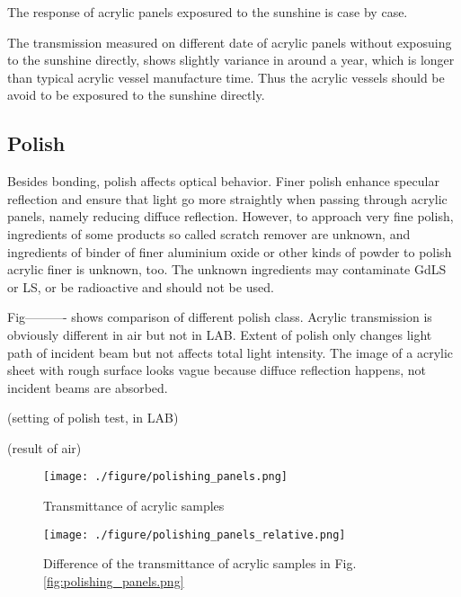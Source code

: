 

The response of acrylic panels exposured to the sunshine is case by case.


The transmission measured on different date of acrylic panels without exposuing to the sunshine directly,
shows slightly variance in around a year, which is longer than typical acrylic vessel manufacture time.
Thus the acrylic vessels should be avoid to be exposured to the sunshine directly.


\subsection {Polish}

Besides bonding, polish affects optical behavior.
Finer polish enhance specular reflection and ensure that light
go more straightly when passing through acrylic panels, namely
reducing diffuce reflection. However, to approach very fine polish,
ingredients of some products so called scratch remover are unknown, and
ingredients of binder of finer aluminium oxide or other kinds of powder to polish
acrylic finer is unknown, too. The unknown ingredients may contaminate GdLS or LS, or
be radioactive and should not be used.

Fig----------  shows comparison of different
polish class. Acrylic transmission is obviously different in air but not in LAB.
Extent of polish only changes light path of incident beam but not affects total light intensity.
The image of a acrylic sheet with rough surface looks vague because diffuce reflection happens, not
incident beams are absorbed.



(setting of polish test, in LAB)




(result of air)
\begin{figure}
    \centering
    \texttt{[image: ./figure/polishing\_panels.png]}
    \caption{Transmittance of acrylic samples}
    \label{polishing_panels.png}
    \end{figure}



\begin{figure}
    \centering
    \texttt{[image: ./figure/polishing\_panels\_relative.png]}
    \caption{Difference of the transmittance of acrylic samples in Fig. \ref{fig:polishing_panels.png}}
    \label{polishing_panels_relative.png}
    \end{figure}


